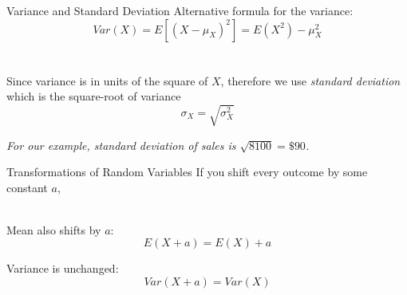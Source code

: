 \documentclass{./../div_teaching_slides}
\begin{document}
%

\begin{frame}{Variance and Standard Deviation}
Alternative formula for the variance:  $$Var(X) = E[(X-\mu_X)^2] = E(X^2)-\mu_X^2$$ \\~\\
Since variance is in units of the square of $X$, therefore we use \textit{standard deviation} which is the square-root of variance
$$ \sigma_X = \sqrt{\sigma^2_X}  $$

\textit{For our example, standard deviation of sales is $\sqrt{8100} = \$ 90 $. 
}\end{frame}

\begin{frame}{Transformations of Random Variables}
 If you shift every outcome by some constant  $a$, \\~\\
  \begin{witemize}
  \item Mean also shifts by $a$:
  $$E(X + a) = E(X) + a $$
  \item Variance is unchanged: 
   $$ Var(X + a) = Var(X) $$
  \end{witemize}
\end{frame}
\end{document}
